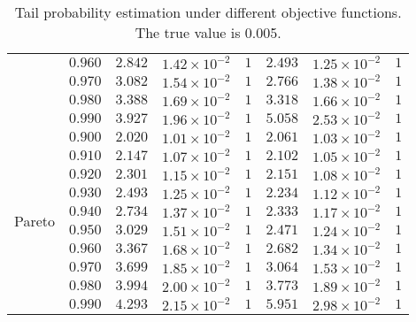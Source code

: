 \begin{table}[ht]
{\begin{tabular}{cc|ccc|ccc}
&$0.960$ & $2.842$ & $1.42\times 10^{-2}$ & $ 1$ & $2.493$ & $1.25\times 10^{-2}$ & $ 1$\\
&$0.970$ & $3.082$ & $1.54\times 10^{-2}$ & $ 1$ & $2.766$ & $1.38\times 10^{-2}$ & $ 1$\\
&$0.980$ & $3.388$ & $1.69\times 10^{-2}$ & $ 1$ & $3.318$ & $1.66\times 10^{-2}$ & $ 1$\\
&$0.990$ & $3.927$ & $1.96\times 10^{-2}$ & $ 1$ & $5.058$ & $2.53\times 10^{-2}$ & $ 1$\\\hline 
\multirow{10}{*}{Pareto}&$0.900$ & $2.020$ & $1.01\times 10^{-2}$ & $ 1$ & $2.061$ & $1.03\times 10^{-2}$ & $ 1$\\
&$0.910$ & $2.147$ & $1.07\times 10^{-2}$ & $ 1$ & $2.102$ & $1.05\times 10^{-2}$ & $ 1$\\
&$0.920$ & $2.301$ & $1.15\times 10^{-2}$ & $ 1$ & $2.151$ & $1.08\times 10^{-2}$ & $ 1$\\
&$0.930$ & $2.493$ & $1.25\times 10^{-2}$ & $ 1$ & $2.234$ & $1.12\times 10^{-2}$ & $ 1$\\
&$0.940$ & $2.734$ & $1.37\times 10^{-2}$ & $ 1$ & $2.333$ & $1.17\times 10^{-2}$ & $ 1$\\
&$0.950$ & $3.029$ & $1.51\times 10^{-2}$ & $ 1$ & $2.471$ & $1.24\times 10^{-2}$ & $ 1$\\
&$0.960$ & $3.367$ & $1.68\times 10^{-2}$ & $ 1$ & $2.682$ & $1.34\times 10^{-2}$ & $ 1$\\
&$0.970$ & $3.699$ & $1.85\times 10^{-2}$ & $ 1$ & $3.064$ & $1.53\times 10^{-2}$ & $ 1$\\
&$0.980$ & $3.994$ & $2.00\times 10^{-2}$ & $ 1$ & $3.773$ & $1.89\times 10^{-2}$ & $ 1$\\
&$0.990$ & $4.293$ & $2.15\times 10^{-2}$ & $ 1$ & $5.951$ & $2.98\times 10^{-2}$ & $ 1$\\
    \hline
    \bottomrule
    \end{tabular}}\caption{Tail probability estimation under different objective functions. The true value is 0.005.}
    \label{tb4_tpe_0.7}
\end{table}